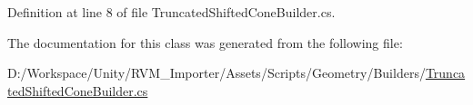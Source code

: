 Definition at line 8 of file Truncated\+Shifted\+Cone\+Builder.\+cs.



The documentation for this class was generated from the following file\+:\begin{DoxyCompactItemize}
\item 
D\+:/\+Workspace/\+Unity/\+R\+V\+M\+\_\+\+Importer/\+Assets/\+Scripts/\+Geometry/\+Builders/\mbox{\hyperlink{_truncated_shifted_cone_builder_8cs}{Truncated\+Shifted\+Cone\+Builder.\+cs}}\end{DoxyCompactItemize}
